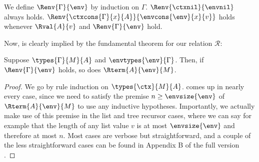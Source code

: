 \begin{definition}
We define $\Renv{\Gamma}{\env}$ by induction on $\Gamma$. $\Renv{\ctxnil}{\envnil}$ always holds. $\Renv{\ctxcons{\Gamma}{x}{A}}{\envcons{\env}{x}{v}}$ holds whenever $\Rval{A}{v}$ and $\Renv{\Gamma}{\env}$ hold.
\end{definition}

Now,  is clearly implied by the fundamental theorem for our relation $\mathcal R$:

\begin{theorem}
Suppose $\types{\Gamma}{M}{A}$ and $\envtypes{\env}{\Gamma}$. Then, if $\Renv{\Gamma}{\env}$ holds, so does $\Rterm{A}{\env}{M}$.
\end{theorem}
\begin{proof}
We go by rule induction on $\types{\ctx}{M}{A}$.  comes up in nearly every case, since we need to satisfy the premise $n \ge \envsize{\env}$ of $\Rterm{A}{\env}{M}$ to use any inductive hypotheses. Importantly, we actually make use of this premise in the list and tree recursor cases, where we can say for example that the length of any list value $v$ is at most $\envsize{\env}$ and therefore at most $n$. Most cases are verbose but straightforward, and a couple of the less straightforward cases can be found in{
  \ifdefined\FULLVERSION
  \else
    Appendix B of the full version~\cite{fullversion}%
  \fi
}.
\end{proof}
